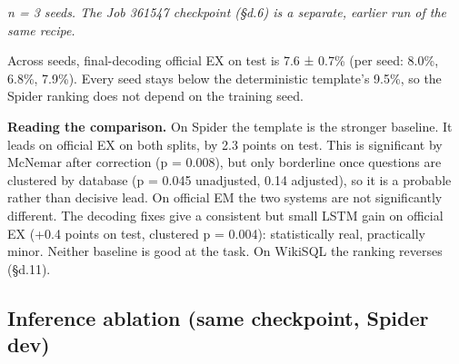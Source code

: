\documentclass[
  10pt,
]{article}
\begin{document}
\emph{n = 3 seeds. The Job 361547 checkpoint (§d.6) is a separate,
earlier run of the same recipe.}

Across seeds, final-decoding official EX on test is 7.6 ± 0.7\% (per
seed: 8.0\%, 6.8\%, 7.9\%). Every seed stays below the deterministic
template's 9.5\%, so the Spider ranking does not depend on the training
seed.

\textbf{Reading the comparison.} On Spider the template is the stronger
baseline. It leads on official EX on both splits, by 2.3 points on test.
This is significant by McNemar after correction (p = 0.008), but only
borderline once questions are clustered by database (p = 0.045
unadjusted, 0.14 adjusted), so it is a probable rather than decisive
lead. On official EM the two systems are not significantly different.
The decoding fixes give a consistent but small LSTM gain on official EX
(+0.4 points on test, clustered p = 0.004): statistically real,
practically minor. Neither baseline is good at the task. On WikiSQL the
ranking reverses (§d.11).

\subsection{Inference ablation (same checkpoint, Spider
dev)}\label{inference-ablation-same-checkpoint-spider-dev}
\end{document}
